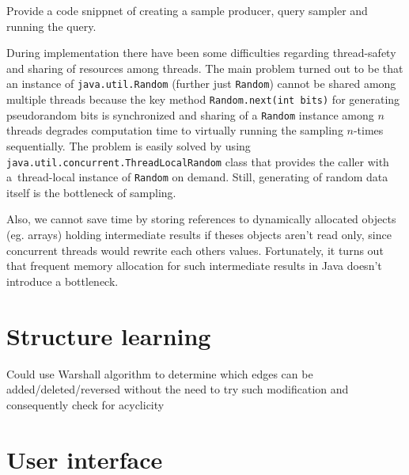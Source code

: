 \documentclass[english,cover]{fitthesis} %
\newcommand{\srccode}[1]{{\tt #1}}         %
\newcommand{\todo}[1]{{\color{red}#1}}
\begin{document}
\medskip
\todo{Provide a code snippnet of creating a sample producer, query sampler and running the query.}

\medskip
During implementation there have been some difficulties regarding thread-safety and sharing of resources among threads. The main problem turned out to be that an instance of \srccode{java.util.Random} (further just \srccode{Random}) cannot be shared among multiple threads because the key method \srccode{Random.next(int bits)} for generating pseudorandom bits is synchronized and sharing of a \srccode{Random} instance among $n$ threads degrades computation time to virtually running the sampling $n$-times sequentially. The problem is easily solved by using \srccode{java.util.concurrent.ThreadLocalRandom} class that provides the caller with a~thread-local instance of \srccode{Random} on demand. Still, generating of random data itself is the bottleneck of sampling.

Also, we cannot save time by storing references to dynamically allocated objects (eg. arrays) holding intermediate results if theses objects aren't read only, since concurrent threads would rewrite each others values. Fortunately, it turns out that frequent memory allocation for such intermediate results in Java doesn't introduce a bottleneck.







\section{Structure learning}
\todo{Could use Warshall algorithm to determine which edges can be added/deleted/reversed without the need to try such modification and consequently check for acyclicity}







\section{User interface}
\end{document}
